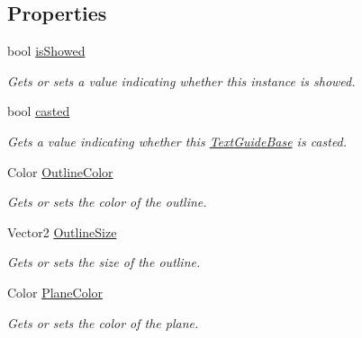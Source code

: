 \subsection*{Properties}
\begin{DoxyCompactItemize}
\item 
bool \hyperlink{class_lerp2_a_p_i_1_1_effects_1_1___text_1_1_text_guide_base_a945781dbdf5b578ba355d6ebc258cf8e}{is\+Showed}
\begin{DoxyCompactList}\small\item\em Gets or sets a value indicating whether this instance is showed. \end{DoxyCompactList}\item 
bool \hyperlink{class_lerp2_a_p_i_1_1_effects_1_1___text_1_1_text_guide_base_a279fa200580f0bc4e092a9fcd8d710f4}{casted}
\begin{DoxyCompactList}\small\item\em Gets a value indicating whether this \hyperlink{class_lerp2_a_p_i_1_1_effects_1_1___text_1_1_text_guide_base}{Text\+Guide\+Base} is casted. \end{DoxyCompactList}\item 
Color \hyperlink{class_lerp2_a_p_i_1_1_effects_1_1___text_1_1_text_guide_base_a07d336ee881f1ecf00ca52c5204a2c8d}{Outline\+Color}
\begin{DoxyCompactList}\small\item\em Gets or sets the color of the outline. \end{DoxyCompactList}\item 
Vector2 \hyperlink{class_lerp2_a_p_i_1_1_effects_1_1___text_1_1_text_guide_base_a408db0613d29f09d8433e17d2f8e1b01}{Outline\+Size}
\begin{DoxyCompactList}\small\item\em Gets or sets the size of the outline. \end{DoxyCompactList}\item 
Color \hyperlink{class_lerp2_a_p_i_1_1_effects_1_1___text_1_1_text_guide_base_a641bf1c379c7434b9c46e23873a575a4}{Plane\+Color}
\begin{DoxyCompactList}\small\item\em Gets or sets the color of the plane. \end{DoxyCompactList}\end{DoxyCompactItemize}


